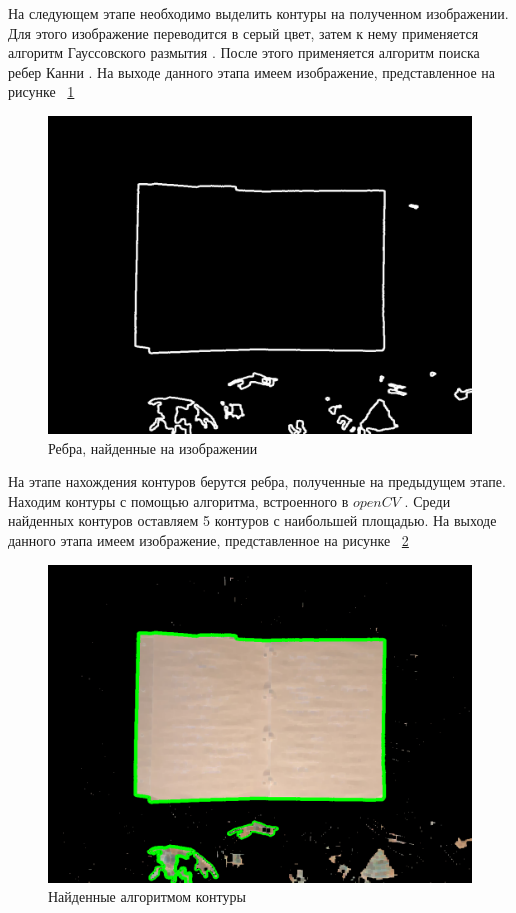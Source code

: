На следующем этапе необходимо выделить контуры на полученном изображении. Для этого изображение переводится в серый цвет, затем к нему применяется алгоритм Гауссовского размытия \cite{gauss_blur}. После этого применяется алгоритм поиска ребер Канни \cite{canny}.
На выходе данного этапа имеем изображение, представленное на рисунке ~\ref{canny}

\begin{figure}
    \includegraphics[scale=0.25]{img/edges}
    \caption{Ребра, найденные на изображении}
    \label{canny}
\end{figure}

На этапе нахождения контуров берутся ребра, полученные на предыдущем этапе. Находим контуры с помощью алгоритма, встроенного в $openCV$ \cite{contours}. 
Среди найденных контуров оставляем 5 контуров с наибольшей площадью. На выходе данного этапа имеем изображение, представленное на рисунке ~\ref{contours}

\begin{figure}
    \includegraphics[scale=0.25]{img/contours}
    \caption{Найденные алгоритмом контуры}
    \label{contours}
\end{figure}

